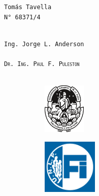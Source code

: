 \begin{titlepage}
\begin{center}
            \large\SemiBold
            \texttt{Tomás Tavella
            \\
            N° 68371/4}
            \\
            \vspace{0.1cm}
            \LARGE\scshape
            \normalfont
            \\
            \vspace{0.5cm}
            \begin{multicols}{2}
            \large\SemiBold
            \texttt{Ing. Jorge L. Anderson}
            \\
            \vspace{0.1cm}
            \LARGE\scshape
            \normalfont
            \\
            \columnbreak
            \vspace{0.6cm}
            \large\SemiBold
            \texttt{Dr. Ing. Paul F. Puleston}
            \\
            \vspace{0.1cm}
            \LARGE\scshape
            \normalfont
            \\
            \end{multicols}
            \vfill
            \begin{figure}[H]
                \centering
                \begin{subfigure}
                    \centering
                    \includegraphics[width=0.225\textwidth]{Imagenes/UNLP.pdf}
                \end{subfigure}
                \begin{subfigure}
                    \centering
                    \includegraphics[width=0.288\textwidth]{Imagenes/FI Invertido.png}

\end{subfigure}
\end{figure}
\end{center}
\end{titlepage}
